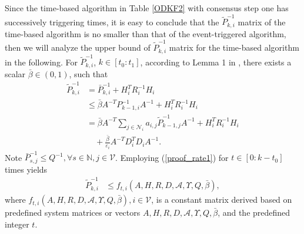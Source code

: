 \documentclass[journal,transmag]{IEEEtran}
\begin{document}
{	Since the time-based algorithm in Table \ref{ODKF2}	with consensus step one has successively triggering times,
	it is easy to conclude that the $\tilde P_{k,i}^{-1}$ matrix of the time-based algorithm is no smaller than that of the event-triggered algorithm, then
	we will analyze the upper bound of $\tilde P_{k,i}^{-1}$ matrix for the time-based algorithm in the following.
	For $\tilde P_{k,i}^{-1}$, $k\in [t_0:t_1]$,
	according to Lemma 1 in \cite{Battistelli2014Kullback}, there exists a scalar $ \bar \beta \in(0,1) $, such that 
	\begin{align}\label{proof_rate1}
	\tilde P_{k,i}^{-1}&=\bar P_{k,i}^{-1} +H_{i}^TR_{i}^{-1}H_{i}\nonumber\\
	&\leq\bar \beta A^{-T}P_{k-1,i}^{-1}A^{-1}+H_{i}^TR_{i}^{-1}H_{i}\nonumber\\
	&=\bar\beta A^{-T}\sum_{j\in \mathcal{N}_{i}}a_{i,j}\tilde P_{k-1,j}^{-1}A^{-1}+H_{i}^TR_{i}^{-1}H_{i}\\
	&\quad+\frac{\bar\beta}{\varepsilon_i } A^{-T}D_{i}^TD_{i}A^{-1}\nonumber.
	\end{align}
	Note $\bar P_{s,j}^{-1}\leq Q^{-1},\forall s\in\mathbb{N},j\in\mathcal{V}$.
	Employing (\ref{proof_rate1}) for $t\in [0:k-t_0]$ times  yields 
	\begin{align}\label{eq_larger}
	\tilde P_{k,i}^{-1}&\leq 
	f_{t,i} (A,H,R,D,\mathcal{A},\Upsilon,Q,\bar\beta),
	\end{align}
	where $f_{t,i} (A,H,R,D,\mathcal{A},\Upsilon,Q,\bar\beta), i\in\mathcal{V}$,  is a constant matrix derived based on predefined system matrices or vectors $A,H,R,D,\mathcal{A},\Upsilon,Q,\bar\beta$, and  the predefined integer $t$.
	
}
\end{document}
